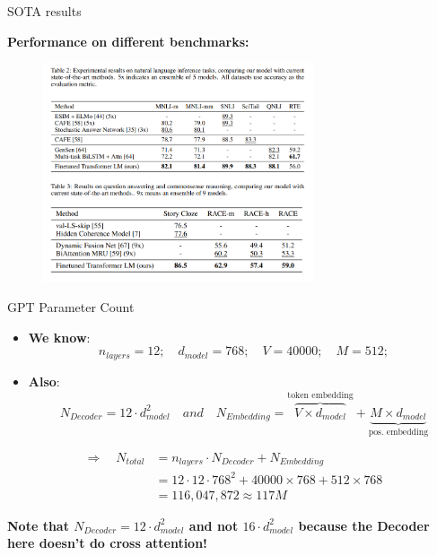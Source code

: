 
\begin{vbframe}{SOTA results}

\vfill

	\textbf{Performance on different benchmarks:}

	\begin{figure}
		\centering
		\includegraphics[width = 8cm]{figure/gpt-sota.png}\\ 
	\end{figure}

\vfill

\end{vbframe}


\begin{vbframe}{GPT Parameter Count}

\vfill 

\begin{itemize}
    \item \textbf{We know}: 
        $$n_{layers} = 12; \quad d_{model} = 768; \quad V = 40000; \quad M = 512;$$
    \item \textbf{Also}: 
        $$N_{Decoder} = 12\cdot d_{model}^2 \quad and \quad  N_{Embedding} = \overbrace{V \times d_{model}}^{\text{token embedding}} + \underbrace{M \times d_{model}}_{\text{pos. embedding}}$$
 \end{itemize}

$$
\begin{aligned}
\Rightarrow \quad N_{total} &= n_{layers} \cdot N_{Decoder} + N_{Embedding} \\ 
&= 12\cdot 12\cdot 768^2 + 40000\times 768 + 512\times 768 \\
&= 116,047,872 \approx 117M
\end{aligned}
$$

\vfill
\textbf{Note that $N_{Decoder} = 12\cdot d_{model}^2$ and not $16 \cdot d_{model}^2$ because the Decoder here doesn't do cross attention!}
  
\end{vbframe}


\endlecture

